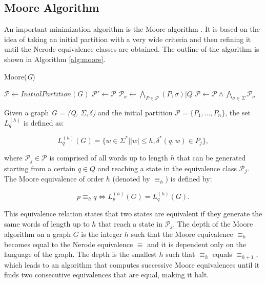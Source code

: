 {\subsection{Moore Algorithm}

An important minimization algorithm is the Moore algorithm \cite{moore1956gedanken}. It is based on the idea of taking an initial partition with a very wide criteria and then refining it until the Nerode equivalence classes are obtained. The outline of the algorithm is shown in Algorithm \ref{alg:moore}.

\begin{algorithm} [b]
  \caption{Moore(\textit{G})\label{alg:moore}}
    \begin{algorithmic}[1]
      \State $\mathcal{P} \leftarrow InitialPartition(G)$
      \Repeat
      	\State $\mathcal{P}' \leftarrow \mathcal{P}$
      	\ForAll{$\sigma \in \Sigma$}
      		\State $\mathcal{P}_{\sigma} \leftarrow \bigwedge_{P\in \mathcal{P}}(P,\sigma)|Q$
      	\EndFor
      	\State $\mathcal{P} \leftarrow \mathcal{P}\wedge\bigwedge_{\sigma\in\Sigma}\mathcal{P}_{\sigma}$
    \end{algorithmic}
  \end{algorithm}
 
Given a graph \textit{G = (Q, $\Sigma, \delta$)} and the initial partition $\mathcal{P} = \{P_1,\ldots, P_n\}$, the set $L_q^{(h)}$ is defined as:

\[
L_q^{(h)}(G) = \{w \in \Sigma^* | |w| \leq h, \delta^*(q,w) \in P_j\},
\]

\noindent where $\mathcal{P}_j \in \mathcal{P}$  is comprised of all words up to length $h$ that can be generated starting from a certain $q \in Q$ and reaching a state in the equivalence class $\mathcal{P}_j$. The Moore equivalence of order $h$ (denoted by $\equiv_h$) is defined by:

\[
p \equiv_h q \Leftrightarrow L_p^{(h)}(G) = L_q^{(h)}(G).
\]

\noindent This equivalence relation states that two states are equivalent if they generate the same words of length up to $h$ that reach a state in $\mathcal{P}_j$. The depth of the Moore algorithm on a graph $G$ is the integer $h$ such that the Moore equivalence $\equiv_h$ becomes equal to the Nerode equivalence $\equiv$ and it is dependent only on the language of the graph. The depth is the smallest $h$ such that $\equiv_h$ equals $\equiv_{h+1}$, which leads to an algorithm that computes successive Moore equivalences until it finds two consecutive equivalences that are equal, making it halt.

}
